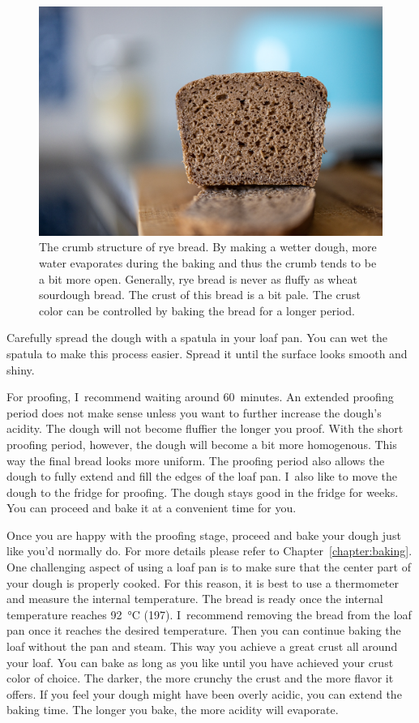 \begin{figure}[!htb]
  \includegraphics[width=\textwidth]{crumb}
  \caption{The crumb structure of rye bread. By making a wetter
  dough, more water evaporates during the baking and thus the
  crumb tends to be a bit more open. Generally, rye
  bread is never as fluffy as wheat sourdough bread. The crust
  of this bread is a bit pale. The crust color can be controlled
  by baking the bread for a longer period.}%
  \label{fig:rye-crumb}
\end{figure}

Carefully spread the dough with a spatula in your loaf pan. You
can wet the spatula to make this process easier. Spread it
until the surface looks smooth and shiny.

For proofing, I~recommend waiting around 60~minutes. An extended
proofing period does not make sense unless you want to further
increase the dough's acidity. The dough will not become fluffier
the longer you proof. With the short proofing period, however,
the dough will become a bit more homogenous. This way the final
bread looks more uniform. The proofing period also allows the
dough to fully extend and fill the edges of the loaf pan. I~also
like to move the dough to the fridge for proofing. The dough stays
good in the fridge for weeks. You can proceed and bake it at a
convenient time for you. 

Once you are happy with the proofing stage, proceed and bake your dough
just like you'd normally do. For more details please refer to 
Chapter~\ref{chapter:baking}. One challenging aspect
of using a loaf pan is to make sure that the center part of your
dough is properly cooked. For this reason, it is best to use a thermometer
and measure the internal temperature. The bread is
ready once the internal temperature reaches  \qty{92}{\degreeCelsius} (\qty{197}{\degF}). I~recommend
removing the bread from the loaf pan once it reaches the desired
temperature. Then you can continue baking the loaf without the pan and
steam. This way you achieve a great crust all around your
loaf. You can bake as long as you like until you have achieved
your crust color of choice. The darker, the more crunchy
the crust and the more flavor it offers. If you feel your
dough might have been overly acidic, you can extend the baking time.
The longer you bake, the more acidity will evaporate.

